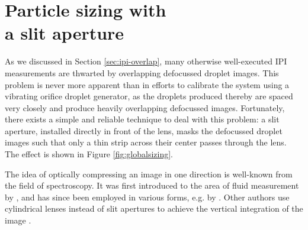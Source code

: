 \documentclass[10pt]{book}
\begin{document}
\chapter[Particle sizing with a slit aperture]{Particle sizing with \\a slit aperture}
\label{chp:slit-aperture}
As we discussed in Section \ref{sec:ipi-overlap}, many otherwise well-executed IPI
measurements are thwarted by overlapping defocussed droplet images.
This problem is never more apparent than in efforts to calibrate
the system using a vibrating orifice droplet generator, as the droplets produced
thereby are spaced very closely and produce heavily overlapping defocussed
images. Fortunately, there exists a simple and reliable technique to deal with
this problem: a slit aperture, installed directly in front of the lens, masks
the defocussed droplet images such that only a thin strip across their center
passes through the lens. The effect is shown in Figure \ref{fig:globalsizing}. 

The idea of optically compressing an image in one direction is
well-known from the field of spectroscopy. It was first introduced to the area
of fluid measurement by \citet{Durst94}, and has since been employed in various
forms, e.g. by \citet{Pan06}. Other authors use cylindrical lenses instead
of slit apertures to achieve the vertical integration of the image
\cite{Kawaguchi02}.
\end{document}

